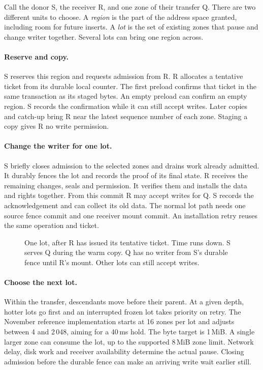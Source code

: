 \documentclass[11pt]{article}
\begin{document}
Call the donor S, the receiver R, and one zone of their transfer Q. There are two different units to choose. A \emph{region} is the part of the address space granted, including room for future inserts. A \emph{lot} is the set of existing zones that pause and change writer together. Several lots can bring one region across.

\paragraph{Reserve and copy.}
S reserves this region and requests admission from R. R allocates a tentative ticket from its durable local counter. The first preload confirms that ticket in the same transaction as its staged bytes. An empty preload can confirm an empty region. S records the confirmation while it can still accept writes. Later copies and catch-up bring R near the latest sequence number of each zone. Staging a copy gives R no write permission.

\paragraph{Change the writer for one lot.}
S briefly closes admission to the selected zones and drains work already admitted. It durably fences the lot and records the proof of its final state. R receives the remaining changes, seals and permission. It verifies them and installs the data and rights together. From this commit R may accept writes for Q. S records the acknowledgement and can collect its old data. The normal lot path needs one source fence commit and one receiver mount commit. An installation retry reuses the same operation and ticket.

\begin{figure}[H]
    \centering
    \caption{One lot, after R has issued its tentative ticket. Time runs down. S serves Q during the warm copy. Q has no writer from S's durable fence until R's mount. Other lots can still accept writes.}
\end{figure}

\paragraph{Choose the next lot.}
Within the transfer, descendants move before their parent. At a given depth, hotter lots go first and an interrupted frozen lot takes priority on retry. The November reference implementation starts at 16 zones per lot and adjusts between 4 and 2\,048, aiming for a 40\,ms hold. The byte target is 1\,MiB. A single larger zone can consume the lot, up to the supported 8\,MiB zone limit. Network delay, disk work and receiver availability determine the actual pause. Closing admission before the durable fence can make an arriving write wait earlier still.
\end{document}
